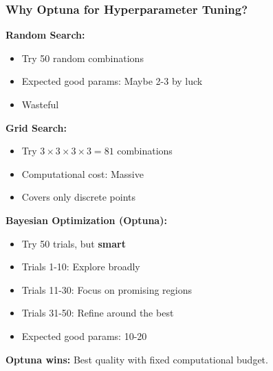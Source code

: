 \documentclass{beamer}
\begin{document}
\begin{frame}[fragile]
\frametitle{Why Optuna for Hyperparameter Tuning?}

\textbf{Random Search:}
\begin{itemize}
    \item Try 50 random combinations
    \item Expected good params: Maybe 2-3 by luck
    \item Wasteful
\end{itemize}

\vspace{0.2cm}
\textbf{Grid Search:}
\begin{itemize}
    \item Try $3 \times 3 \times 3 \times 3 = 81$ combinations
    \item Computational cost: Massive
    \item Covers only discrete points
\end{itemize}

\vspace{0.2cm}
\textbf{Bayesian Optimization (Optuna):}
\begin{itemize}
    \item Try 50 trials, but \textbf{smart}
    \item Trials 1-10: Explore broadly
    \item Trials 11-30: Focus on promising regions
    \item Trials 31-50: Refine around the best
    \item Expected good params: 10-20
\end{itemize}

\vspace{0.3cm}
\begin{center}
\textbf{Optuna wins:} Best quality with fixed computational budget.
\end{center}

\end{frame}
\end{document}

